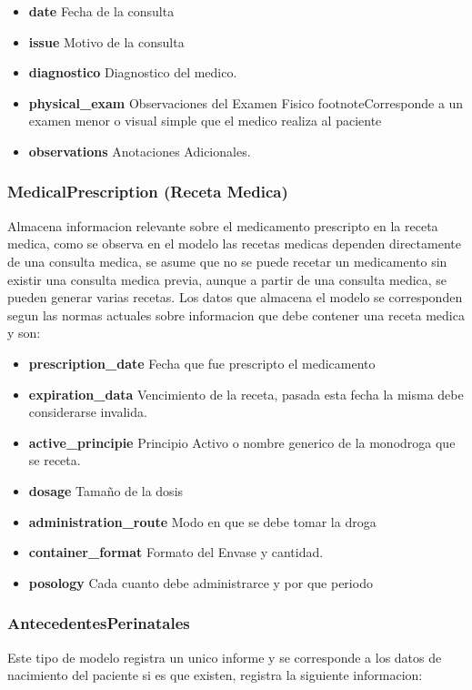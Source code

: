 \begin{itemize}
    \item \textbf{date} Fecha de la consulta
    \item \textbf{issue} Motivo de la consulta
    \item \textbf{diagnostico} Diagnostico del medico.
    \item \textbf{physical\_exam} Observaciones del Examen Fisico footnote{Corresponde
        a un examen menor o visual simple que el medico realiza al paciente}
    \item \textbf{observations} Anotaciones Adicionales. 
\end{itemize}

\subsubsection{MedicalPrescription (Receta Medica)}
Almacena informacion relevante sobre el medicamento prescripto en la receta
medica, como se observa en el modelo las recetas medicas dependen directamente
de una consulta medica, se asume que no se puede recetar un medicamento sin
existir una consulta medica previa, aunque a partir de una consulta medica, se
pueden generar varias recetas. Los datos que almacena el modelo se corresponden
segun las normas actuales sobre informacion que debe contener una receta medica
y son:

\begin{itemize}
    \item \textbf{prescription\_date} Fecha que fue prescripto el medicamento
    \item \textbf{expiration\_data} Vencimiento de la receta, pasada esta fecha la
        misma debe considerarse invalida.
    \item \textbf{active\_principie} Principio Activo o nombre generico de la
    monodroga que se receta.
    \item \textbf{dosage} Tama\~no de la dosis
    \item \textbf{administration\_route} Modo en que se debe tomar la droga
    \item \textbf{container\_format} Formato del Envase y cantidad.
    \item \textbf{posology} Cada cuanto debe administrarce y por que periodo
\end{itemize}

\subsubsection{AntecedentesPerinatales}
Este tipo de modelo registra un unico informe y se corresponde a los datos de
nacimiento del paciente si es que existen, registra la siguiente informacion:


